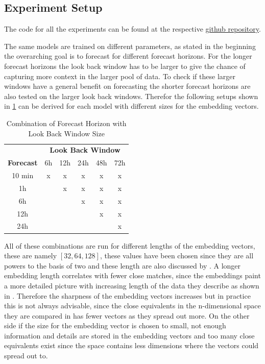 \documentclass{article}
\begin{document}
\subsection{Experiment Setup}

The code for all the experiments can be found at the respective \href{https://github.com/janbesler/Masterarbeit}{github repository}.

The same models are trained on different parameters, as stated in the beginning the overarching goal is to forecast for different forecast horizons. For the longer forecast horizons the look back window has to be larger to give the chance of capturing more context in the larger pool of data. To check if these larger windows have a general benefit on forecasting the shorter forecast horizons are also tested on the larger look back windows. Therefor the following setups shown in \ref{tab:forecast-lookback} can be derived for each model with different sizes for the embedding vectors. 

\begin{table}[h!]
  \begin{center}
    \begin{tabular}{c|c|c|c|c|c}
      \toprule %
       & \multicolumn{5}{c}{\textbf{Look Back Window}} \\
      \textbf{Forecast} & 6h & 12h & 24h & 48h & 72h \\
      \midrule %
      10 min & x & x & x & x & x \\
      1h &  & x & x & x & x \\
      6h &  &  & x & x & x \\
      12h &  &  &  & x & x \\
      24h &  &  &  &  & x \\
      \bottomrule %
    \end{tabular}
    \caption{Combination of Forecast Horizon with Look Back Window Size}
    \label{tab:forecast-lookback}
  \end{center}
\end{table}

All of these combinations are run for different lengths of the embedding vectors, these are namely $[32, 64, 128]$, these values have been chosen since they are all powers to the basis of two and these length are also discussed by \cite{optimal_embedding_length}. A longer embedding length correlates with fewer close matches, since the embeddings paint a more detailed picture with increasing length of the data they describe as shown in \cite{introduction_embeddings}. Therefore the sharpness of the embedding vectors increases but in practice this is not always advisable, since the close equivalents in the n-dimensional space they are compared in has fewer vectors as they spread out more. On the other side if the size for the embedding vector is chosen to small, not enough information and details are stored in the embedding vectors and too many close equivalents exist since the space contains less dimensions where the vectors could spread out to.
\end{document}
